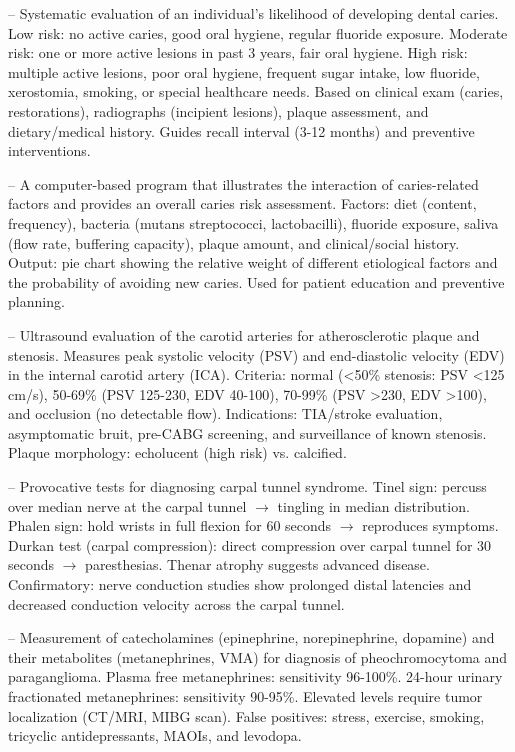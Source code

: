 -- Systematic evaluation of an individual's likelihood of developing dental caries. Low risk: no active caries, good oral hygiene, regular fluoride exposure. Moderate risk: one or more active lesions in past 3 years, fair oral hygiene. High risk: multiple active lesions, poor oral hygiene, frequent sugar intake, low fluoride, xerostomia, smoking, or special healthcare needs. Based on clinical exam (caries, restorations), radiographs (incipient lesions), plaque assessment, and dietary/medical history. Guides recall interval (3-12 months) and preventive interventions.

-- A computer-based program that illustrates the interaction of caries-related factors and provides an overall caries risk assessment. Factors: diet (content, frequency), bacteria (mutans streptococci, lactobacilli), fluoride exposure, saliva (flow rate, buffering capacity), plaque amount, and clinical/social history. Output: pie chart showing the relative weight of different etiological factors and the probability of avoiding new caries. Used for patient education and preventive planning.

-- Ultrasound evaluation of the carotid arteries for atherosclerotic plaque and stenosis. Measures peak systolic velocity (PSV) and end-diastolic velocity (EDV) in the internal carotid artery (ICA). Criteria: normal (<50\% stenosis: PSV <125 cm/s), 50-69\% (PSV 125-230, EDV 40-100), 70-99\% (PSV >230, EDV >100), and occlusion (no detectable flow). Indications: TIA/stroke evaluation, asymptomatic bruit, pre-CABG screening, and surveillance of known stenosis. Plaque morphology: echolucent (high risk) vs. calcified.

-- Provocative tests for diagnosing carpal tunnel syndrome. Tinel sign: percuss over median nerve at the carpal tunnel $\rightarrow$ tingling in median distribution. Phalen sign: hold wrists in full flexion for 60 seconds $\rightarrow$ reproduces symptoms. Durkan test (carpal compression): direct compression over carpal tunnel for 30 seconds $\rightarrow$ paresthesias. Thenar atrophy suggests advanced disease. Confirmatory: nerve conduction studies show prolonged distal latencies and decreased conduction velocity across the carpal tunnel.

-- Measurement of catecholamines (epinephrine, norepinephrine, dopamine) and their metabolites (metanephrines, VMA) for diagnosis of pheochromocytoma and paraganglioma. Plasma free metanephrines: sensitivity 96-100\%. 24-hour urinary fractionated metanephrines: sensitivity 90-95\%. Elevated levels require tumor localization (CT/MRI, MIBG scan). False positives: stress, exercise, smoking, tricyclic antidepressants, MAOIs, and levodopa.


